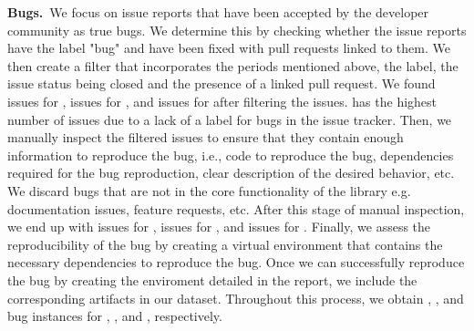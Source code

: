 \documentclass[sigconf,screen]{acmart}
\begin{document}

\textbf{Bugs.}~We focus on issue reports that have been accepted by
the developer community as true bugs. We determine this by checking
whether the issue reports have the label "bug" and have been fixed with pull
requests linked to them. We then create a filter that incorporates
the periods mentioned above, the label, the issue status being closed
and the presence of a linked pull request. We found \numtorchfiltered{}
issues for \torch, \numtffiltered{} issues for \tf, and \numjaxfiltered{}
issues for \jax after filtering the issues. \torch has the highest number
of issues due to a lack of a label for bugs in the issue tracker.
Then, we manually inspect the filtered issues to ensure that they
contain enough information to reproduce the bug, i.e., code to
reproduce the bug, dependencies required for the bug reproduction,
clear description of the desired behavior, etc. We discard bugs that
are not in the core functionality of the library e.g. documentation
issues, feature requests, etc. After this stage of manual inspection,
we end up with \numtorchinspected{} issues for \torch,
\numtfinspected{} issues for \tf, and \numjaxinspected{} issues for
\jax.
%
Finally, we assess the reproducibility of the bug by creating a
virtual environment that contains the necessary dependencies to
reproduce the bug.  Once we can successfully reproduce the bug by
creating the enviroment detailed in the report, we include the
corresponding artifacts in our dataset. Throughout this process, we
obtain \textbf{\numjaxbugs{}}, \textbf{\numtorchbugs{}}, and
\textbf{\numtfbugs{}} bug instances for \jax, \torch, and \tf,
respectively.


\end{document}
